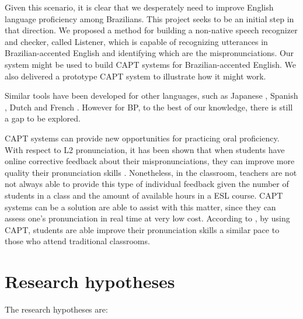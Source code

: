 Given this scenario, it is clear that we desperately need to improve English language proficiency among Brazilians. This project seeks to be an initial step in that direction. We proposed a method for building a non-native speech recognizer and checker, called Listener, which is capable of recognizing utterances in Brazilian-accented English and identifying which are the mispronunciations. Our system might be used to build \ac{CAPT} systems for Brazilian-accented English. We also delivered a prototype \ac{CAPT} system to illustrate how it might work.

Similar tools have been developed for other languages, such as Japanese \cite{Tsubota2004}, Spanish \cite{Reis2011}, Dutch \cite{Strik2009} and French \cite{GenevaLogic2006}. However for \ac{BP}, to the best of our knowledge, there is still a gap to be explored.

\ac{CAPT} systems can provide new opportunities for practicing oral proficiency. With respect to L2 pronunciation, it has been shown that when students have online corrective feedback about their mispronunciations, they can improve more quality their pronunciation skills \cite{Long1983, Lyster2010}. Nonetheless, in the classroom, teachers are not not always able to provide this type of individual feedback given the number of students in a class and the amount of available hours in a \ac{ESL} course. \ac{CAPT} systems can be a solution are able to assist with this matter, since they  can assess one's pronunciation in real time at very low cost. According to \citeauthor{Neri2008} \cite{Neri2008}, by using \ac{CAPT}, students are able improve their pronunciation skills a similar pace to those who attend traditional classrooms.

\section{Research hypotheses}

The research hypotheses are:

